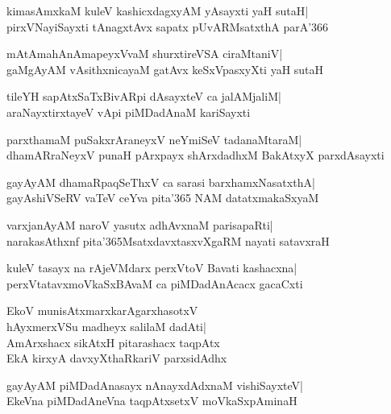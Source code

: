 \documentclass[twoside,12pt,openright]{book}
\newcounter{shloka}[chapter]
\begin{document}
\begin{shloka}%
kimasAmxkaM kuleV kashicxdagxyAM yAsayxti yaH sutaH|\\
pirxVNayiSayxti tAnagxtAvx sapatx pUvARMsatxthA parA\char'366
\end{shloka}

\begin{shloka}%
mAtAmahAnAmapeyxVvaM shurxtireVSA ciraMtaniV|\\
gaMgAyAM vAsithxnicayaM gatAvx keSxVpasxyXti yaH sutaH
\end{shloka}

\begin{shloka}%
tileYH sapAtxSaTxBivARpi dAsayxteV ca jalAMjaliM|\\
araNayxtirxtayeV vApi piMDadAnaM kariSayxti
\end{shloka}

\begin{shloka}%
parxthamaM puSakxrAraneyxV neYmiSeV tadanaMtaraM|\\
dhamARraNeyxV punaH pArxpayx shArxdadhxM BakAtxyX parxdAsayxti
\end{shloka}

\begin{shloka}%
gayAyAM dhamaRpaqSeThxV ca sarasi barxhamxNasatxthA|\\
gayAshiVSeRV vaTeV ceYva pita\char'365 NAM datatxmakaSxyaM
\end{shloka}

\begin{shloka}%
varxjanAyAM naroV yasutx adhAvxnaM parisapaRti|\\
narakasAthxnf pita\char'365MsatxdavxtasxvXgaRM nayati satavxraH
\end{shloka}

\begin{shloka}%
kuleV tasayx na rAjeVMdarx perxVtoV Bavati kashacxna|\\
perxVtatavxmoVkaSxBAvaM ca piMDadAnAcacx gacaCxti
\end{shloka}

\begin{shloka}%
EkoV munisAtxmarxkarAgarxhasotxV\\
hAyxmerxVSu madheyx salilaM dadAti|\\
AmArxshacx sikAtxH pitarashacx taqpAtx\\
EkA kirxyA davxyXthaRkariV parxsidAdhx
\end{shloka}

\begin{shloka}%
gayAyAM piMDadAnasayx nAnayxdAdxnaM vishiSayxteV|\\
EkeVna piMDadAneVna taqpAtxsetxV moVkaSxpAminaH
\end{shloka}
\end{document}
